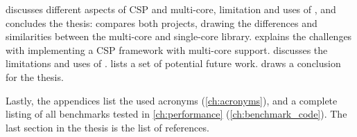  discusses different aspects of CSP and multi\hyp{}core, limitation and uses of \Proxc{}, and concludes the thesis:  compares both projects, drawing the differences and similarities between the multi\hyp{}core and single\hyp{}core library.  explains the challenges with implementing a CSP framework with multi\hyp{}core support.  discusses the limitations and uses of \Proxc{}.  lists a set of potential future work.  draws a conclusion for the thesis.


Lastly, the appendices list the used acronyms (\cref{ch:acronyms}), and a complete listing of all benchmarks tested in \cref{ch:performance} (\cref{ch:benchmark_code}). The last section in the thesis is the list of references.
